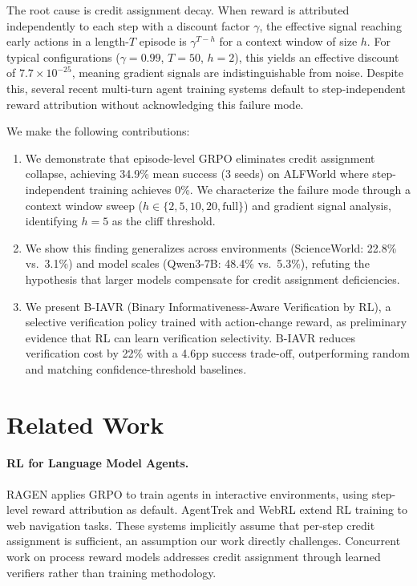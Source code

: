 \documentclass{article}
\begin{document}
The root cause is credit assignment decay. When reward is attributed independently to each step with a discount factor $\gamma$, the effective signal reaching early actions in a length-$T$ episode is $\gamma^{T-h}$ for a context window of size $h$. For typical configurations ($\gamma = 0.99$, $T = 50$, $h = 2$), this yields an effective discount of $7.7 \times 10^{-25}$, meaning gradient signals are indistinguishable from noise. Despite this, several recent multi-turn agent training systems default to step-independent reward attribution without acknowledging this failure mode.

We make the following contributions:
\begin{enumerate}
\item We demonstrate that episode-level GRPO eliminates credit assignment collapse, achieving 34.9\% mean success (3 seeds) on ALFWorld where step-independent training achieves 0\%. We characterize the failure mode through a context window sweep ($h \in \{2,5,10,20,\text{full}\}$) and gradient signal analysis, identifying $h=5$ as the cliff threshold.
\item We show this finding generalizes across environments (ScienceWorld: 22.8\% vs.\ 3.1\%) and model scales (Qwen3-7B: 48.4\% vs.\ 5.3\%), refuting the hypothesis that larger models compensate for credit assignment deficiencies.
\item We present B-IAVR (Binary Informativeness-Aware Verification by RL), a selective verification policy trained with action-change reward, as preliminary evidence that RL can learn verification selectivity. B-IAVR reduces verification cost by 22\% with a 4.6pp success trade-off, outperforming random and matching confidence-threshold baselines.
\end{enumerate}

\section{Related Work}

\paragraph{RL for Language Model Agents.}
RAGEN applies GRPO to train agents in interactive environments, using step-level reward attribution as default. AgentTrek and WebRL extend RL training to web navigation tasks. These systems implicitly assume that per-step credit assignment is sufficient, an assumption our work directly challenges. Concurrent work on process reward models addresses credit assignment through learned verifiers rather than training methodology.
\end{document}
